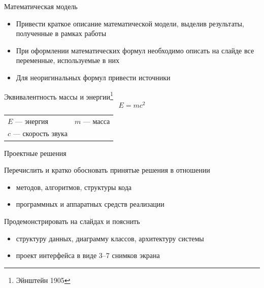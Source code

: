 \documentclass{fefu_presentation}
\begin{document}
    \begin{frame}{Математическая модель}
        \begin{block}{}
            \begin{itemize}
                \item Привести краткое описание математической модели, выделив результаты, полученные в рамках работы
                \item При оформлении математических формул необходимо описать на слайде все переменные, используемые в них
                \item Для неоригинальных формул привести источники
            \end{itemize}
        \end{block}
        \begin{block}{Эквивалентность массы и энергии\footnote{Эйнштейн 1905}}
            \begin{equation}
                E=mc^2
            \end{equation}

            \centering
            \begin{tabular}{ll}
                $E$ --- энергия & $m$ --- масса\\
                $c$ --- скорость звука&\\
            \end{tabular}
        \end{block}
    \end{frame}

    \note{}

    \begin{frame}{Проектные решения}
        \begin{block}{}
            Перечислить и кратко обосновать принятые решения в отношении
            \begin{itemize}
                \item методов, алгоритмов, структуры кода
                \item программных и аппаратных средств реализации
            \end{itemize}
        \end{block}
        \begin{block}{}
            Продемонстрировать на слайдах и пояснить
            \begin{itemize}
                \item структуру данных, диаграмму классов, архитектуру системы
                \item проект интерфейса в виде 3--7 снимков экрана
            \end{itemize}
        \end{block}
    \end{frame}
\end{document}
